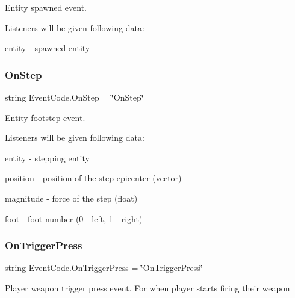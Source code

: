 Entity spawned event. 

Listeners will be given following data\+:
\begin{DoxyItemize}
\item {\ttfamily entity} -\/ spawned entity 
\end{DoxyItemize}\mbox{\label{class_event_code_afe7b5546673f18b5aacb38e272f8dcc0}} 
\subsubsection{\texorpdfstring{OnStep}{OnStep}}
{\footnotesize\ttfamily string Event\+Code.\+On\+Step = \char`\"{}On\+Step\char`\"{}\hspace{0.3cm}{\ttfamily [static]}}



Entity footstep event. 

Listeners will be given following data\+:
\begin{DoxyItemize}
\item {\ttfamily entity} -\/ stepping entity
\item {\ttfamily position} -\/ position of the step epicenter (vector)
\item {\ttfamily magnitude} -\/ force of the step (float)
\item {\ttfamily foot} -\/ foot number (0 -\/ left, 1 -\/ right) 
\end{DoxyItemize}\mbox{\label{class_event_code_a42a2b4374afaaf0c95694abdd93e7fe9}} 
\subsubsection{\texorpdfstring{OnTriggerPress}{OnTriggerPress}}
{\footnotesize\ttfamily string Event\+Code.\+On\+Trigger\+Press = \char`\"{}On\+Trigger\+Press\char`\"{}\hspace{0.3cm}{\ttfamily [static]}}



Player weapon trigger press event. For when player starts firing their weapon 

\mbox{\label{class_event_code_a62441710d089523d4630ac962020a6b5}} 
